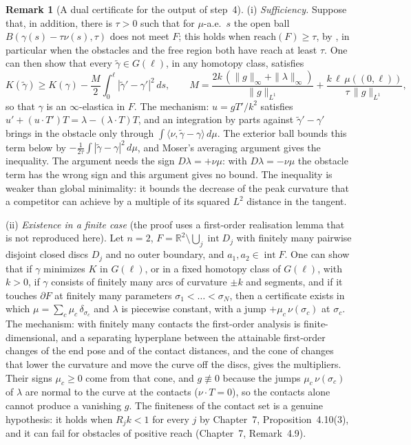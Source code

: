 \documentclass[11pt,reqno]{amsart}
\theoremstyle{definition}
\newtheorem{remark}[theorem]{Remark}
\providecommand{\R}{\mathbb{R}}
\newcommand{\reach}{\mathrm{reach}}
\numberwithin{equation}{section}
\providecommand{\R}{\mathbb{R}}
\providecommand{\xref}[2]{#2}
\begin{document}
\begin{remark}[A dual certificate for the output of step~4]
(i) \emph{Sufficiency.} Suppose that, in addition, there is $\tau > 0$ such that for $\mu$-a.e.\ $s$ the open ball $B(\gamma(s) - \tau\nu(s), \tau)$ does not meet $F$; this holds when $\reach(F) \ge \tau$, by \cite[Theorem~4.8(12)]{federer1959}, in particular when the obstacles and the free region both have reach at least $\tau$. One can then show that every $\tilde\gamma \in G(\ell)$, in any homotopy class, satisfies
\[
K(\tilde\gamma) \ge K(\gamma) - \frac{M}{2}\int_0^\ell |\tilde\gamma' - \gamma'|^2\,ds, \qquad M = \frac{2k\,(\|g\|_\infty + \|\lambda\|_\infty)}{\|g\|_{L^1}} + \frac{k\,\ell\,\mu((0,\ell))}{\tau\,\|g\|_{L^1}},
\]
so that $\gamma$ is an $\infty$-elastica in $F$. The mechanism: $u = gT'/k^2$ satisfies $u' + (u \cdot T')T = \lambda - (\lambda\cdot T)T$, and an integration by parts against $\tilde\gamma' - \gamma'$ brings in the obstacle only through $\int\langle\nu, \tilde\gamma - \gamma\rangle\,d\mu$. The exterior ball bounds this term below by $-\frac{1}{2\tau}\int|\tilde\gamma - \gamma|^2\,d\mu$, and Moser's averaging argument \cite[Proposition~11]{moser2022} gives the inequality. The argument needs the sign $D\lambda = +\nu\mu$: with $D\lambda = -\nu\mu$ the obstacle term has the wrong sign and this argument gives no bound. The inequality is weaker than global minimality: it bounds the decrease of the peak curvature that a competitor can achieve by a multiple of its squared $L^2$ distance in the tangent.

(ii) \emph{Existence in a finite case} (the proof uses a first-order realisation lemma that is not reproduced here). Let $n = 2$, $F = \R^2 \setminus \bigcup_j \operatorname{int} D_j$ with finitely many pairwise disjoint closed discs $D_j$ and no outer boundary, and $a_1, a_2 \in \operatorname{int} F$. One can show that if $\gamma$ minimizes $K$ in $G(\ell)$, or in a fixed homotopy class of $G(\ell)$, with $k > 0$, if $\gamma$ consists of finitely many arcs of curvature $\pm k$ and segments, and if it touches $\partial F$ at finitely many parameters $\sigma_1 < \dots < \sigma_N$, then a certificate exists in which $\mu = \sum_c \mu_c\,\delta_{\sigma_c}$ and $\lambda$ is piecewise constant, with a jump $+\mu_c\,\nu(\sigma_c)$ at $\sigma_c$. The mechanism: with finitely many contacts the first-order analysis is finite-dimensional, and a separating hyperplane between the attainable first-order changes of the end pose and of the contact distances, and the cone of changes that lower the curvature and move the curve off the discs, gives the multipliers. Their signs $\mu_c \ge 0$ come from that cone, and $g \not\equiv 0$ because the jumps $\mu_c\,\nu(\sigma_c)$ of $\lambda$ are normal to the curve at the contacts ($\nu \cdot T = 0$), so the contacts alone cannot produce a vanishing $g$. The finiteness of the contact set is a genuine hypothesis: it holds when $R_j k < 1$ for every $j$ by Chapter~7, Proposition~\xref{chap07:prop:sharp_disc_spacing}{4.10}(3), and it can fail for obstacles of positive reach (Chapter~7, Remark~\xref{chap07:rem:notched_disc}{4.9}).
\end{remark}
\end{document}
